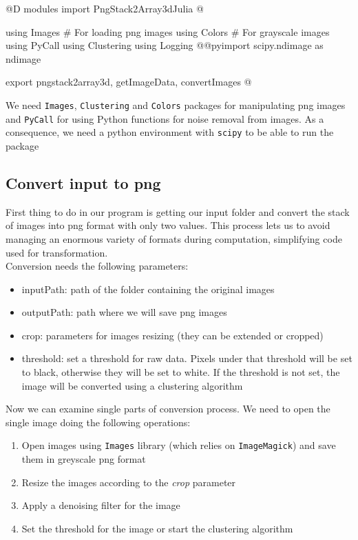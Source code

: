 \documentclass[11pt,oneside]{article}	%
\begin{document}
@D modules import PngStack2Array3dJulia
@{using Images # For loading png images
using Colors # For grayscale images
using PyCall
using Clustering
using Logging
@@pyimport scipy.ndimage as ndimage

export pngstack2array3d, getImageData, convertImages
@}

We need \texttt{Images}, \texttt{Clustering} and \texttt{Colors} packages for manipulating png images and \texttt{PyCall} for using Python functions for noise removal from images.
As a consequence, we need a python environment with \texttt{scipy} to be able to run the package

\subsection{Convert input to png}\label{sec:convertPNG}

First thing to do in our program is getting our input folder and convert the stack of images into png format with only two values. This process lets us to avoid managing an enormous variety of formats during computation, simplifying code used for transformation.\\

Conversion needs the following parameters:
\begin{itemize}
 \item inputPath: path of the folder containing the original images
 \item outputPath: path where we will save png images
 \item crop: parameters for images resizing (they can be extended or cropped)
 \item threshold: set a threshold for raw data. Pixels under that threshold will be set to black, otherwise they will be set to white. If the threshold is not set, the image will be converted using a clustering algorithm
\end{itemize}

Now we can examine single parts of conversion process. We need to open the single image doing the following operations:
\begin{enumerate}
 \item Open images using \texttt{Images} library (which relies on \texttt{ImageMagick}) and save them in greyscale png format 
 \item Resize the images according to the \textit{crop} parameter
 \item Apply a denoising filter for the image
 \item Set the threshold for the image or start the clustering algorithm
\end{enumerate}
\end{document}
